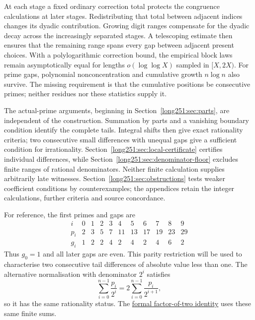 At each stage a fixed ordinary correction total protects the congruence
calculations at later stages.  Redistributing that total between adjacent
indices changes its dyadic contribution.  Growing digit ranges compensate for the dyadic decay
across the increasingly separated stages.
A telescoping estimate then ensures that the remaining range spans every
gap between adjacent present choices.
With a polylogarithmic correction bound, the empirical block laws remain
asymptotically equal for lengths $o(\log\log X)$ sampled in $[X,2X)$.
For prime gaps, polynomial nonconcentration and cumulative growth
$n\log n$ also survive.  The missing requirement is that the cumulative
positions be consecutive primes; neither residues nor these statistics
supply it.

The actual-prime arguments, beginning in Section~\ref{long251:sec:parts},
are independent of the construction.  Summation by parts and a vanishing
boundary condition identify the complete tails.  Integral shifts then
give exact rationality criteria; two consecutive small differences with
unequal gaps give a sufficient condition for irrationality.  Section~\ref{long251:sec:local-certificate}
certifies individual differences, while
Section~\ref{long251:sec:denominator-floor} excludes finite ranges of
rational denominators.  Neither finite calculation supplies arbitrarily
late witnesses.  Section~\ref{long251:sec:obstructions} tests weaker
coefficient conditions by counterexamples; the appendices retain the
integer calculations, further criteria and source concordance.

For reference, the first primes and gaps are
\[
 \begin{array}{c|cccccccccc}
  i   & 0&1&2&3&4 &5 &6 &7 &8 &9\\\hline
  p_i & 2&3&5&7&11&13&17&19&23&29\\
  g_i & 1&2&2&4&2 &4 &2&4&6&2
 \end{array}
\]
Thus $g_0=1$ and all later gaps are even.  This parity restriction will be
used to characterise two consecutive tail differences of absolute value
less than one.  The alternative normalisation with denominator $2^i$ satisfies
\[
 \sum_{i=0}^{n-1}\frac{p_i}{2^i}
 =2\sum_{i=0}^{n-1}\frac{p_i}{2^{i+1}},
\]
so it has the same rationality status.  The
\href{https://github.com/wcook04/plectis-erdos/blob/3d6d938d696fed0fb71dd55115a18a73738ff223/lean/ErdosProblems/Erdos251/PrimeGapDyadicTail.lean\#L111}{formal factor-of-two identity}
uses these same finite sums.

